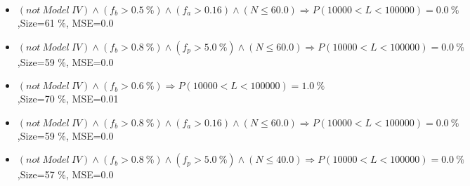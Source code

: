 \documentclass[numbered]{CSL}
\begin{document}
\begin{itemize}
\item $(not~Model~IV) \land (f_b > 0.5~\%) \land (f_a > 0.16) \land (N \leq 60.0) \Rightarrow P(10 000 < L < 100 000) = 0.0~\%$,\hfill Size=61 \%, MSE=0.0
\item $(not~Model~IV) \land (f_b > 0.8~\%) \land (f_p > 5.0~\%) \land (N \leq 60.0) \Rightarrow P(10 000 < L < 100 000) = 0.0~\%$,\hfill Size=59 \%, MSE=0.0
\item $(not~Model~IV) \land (f_b > 0.6~\%) \Rightarrow P(10 000 < L < 100 000) = 1.0~\%$,\hfill Size=70 \%, MSE=0.01
\item $(not~Model~IV) \land (f_b > 0.8~\%) \land (f_a > 0.16) \land (N \leq 60.0) \Rightarrow P(10 000 < L < 100 000) = 0.0~\%$,\hfill Size=59 \%, MSE=0.0
\item $(not~Model~IV) \land (f_b > 0.8~\%) \land (f_p > 5.0~\%) \land (N \leq 40.0) \Rightarrow P(10 000 < L < 100 000) = 0.0~\%$,\hfill Size=57 \%, MSE=0.0
\end{itemize}
\end{document}
